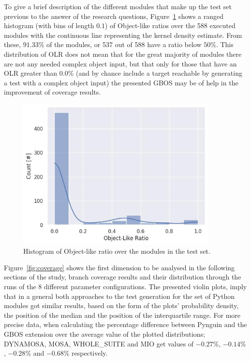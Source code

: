 \documentclass[%
  chapterprefix=false,%
  open=right,%
  twoside=true,%
  paper=a4,%
  logofile={Figures/logo.png},%
  thesistype=master,%
  UKenglish,%
]{se2thesis}
\begin{document}
To give a brief description of the different modules that make up the test set previous to the answer of the research questions, Figure~\ref{fig:olr-hist} shows a ranged histogram (with bins of length \(0.1\)) of Object-like ratios over the 588 executed modules with the continuous line representing the kernel density estimate.
From these, \(91.33\%\) of the modules, or 537 out of 588 have a ratio below \(50\%\).
This distribution of OLR does not mean that for the great majority of modules there are not any needed complex object input, but that only for those that have an OLR greater than \(0.0\%\) (and by chance include a target reachable by generating a test with a complex object input) the presented GBOS may be of help in the improvement of coverage results.

\begin{figure}[bth]
  \centering
  \includegraphics[width=0.9\textwidth]{Figures/Results/olr-hist.jpg}
  \caption{Histogram of Object-like ratio over the modules in the test set.}\label{fig:olr-hist}
\end{figure}

Figure~\ref{fig:coverage} shows the first dimension to be analysed in the following sections of the study, branch coverage results and their distribution through the runs of the 8 different parameter configurations.
The presented violin plots, imply that in a general both approaches to the test generation for the set of Python modules got similar results, based on the form of the plots' probability density, the position of the median and the position of the interquartile range.
For more precise data, when calculating the percentage difference between Pynguin and the GBOS extension over the average value of the plotted distributions; DYNAMOSA, MOSA, WHOLE\_SUITE and MIO get values of \(-0.27\%\), \(-0.14\%\), \(-0.28\%\) and \(-0.68\%\) respectively. 
\end{document}
